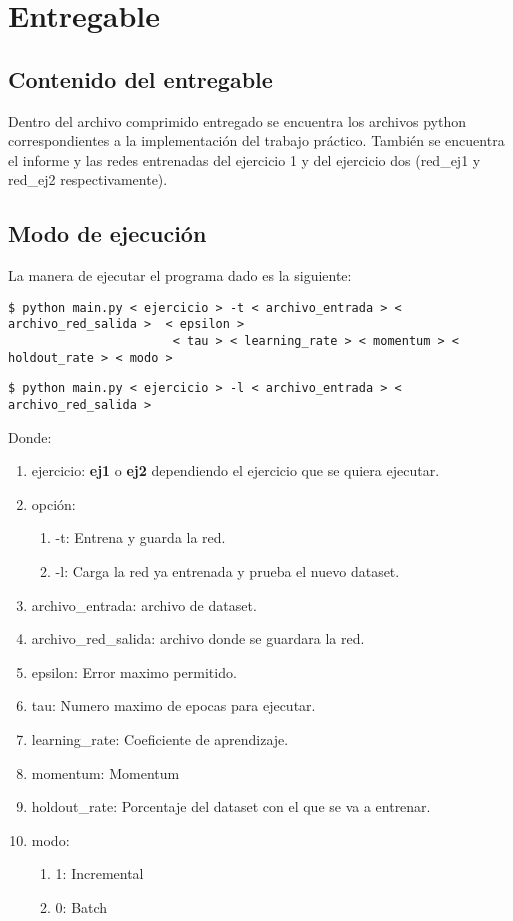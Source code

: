 \section{Entregable}
\subsection{Contenido del entregable}

Dentro del archivo comprimido entregado se encuentra los archivos python correspondientes a la implementación del trabajo práctico. También se encuentra el informe y las redes entrenadas del ejercicio 1 y del ejercicio dos (red\_ej1 y red\_ej2 respectivamente).
\subsection{Modo de ejecución}

La manera de ejecutar el programa dado es la siguiente:


\begin{verbatim}
$ python main.py < ejercicio > -t < archivo_entrada > < archivo_red_salida >  < epsilon > 
                       < tau > < learning_rate > < momentum > < holdout_rate > < modo >
\end{verbatim}
\begin{verbatim}
$ python main.py < ejercicio > -l < archivo_entrada > < archivo_red_salida > 
\end{verbatim}

Donde:

\begin{enumerate}
\item ejercicio: \textbf{ej1} o \textbf{ej2} dependiendo el ejercicio que se quiera ejecutar.
\item opción: 
\begin{enumerate}
\item -t: Entrena y guarda la red.
\item -l: Carga la red ya entrenada y prueba el nuevo dataset.
\end{enumerate}
\item archivo\_entrada: archivo de dataset.
\item archivo\_red\_salida: archivo donde se guardara la red.
\item epsilon: Error maximo permitido.
\item tau: Numero maximo de epocas para ejecutar.
\item learning\_rate: Coeficiente de aprendizaje.
\item momentum: Momentum
\item holdout\_rate: Porcentaje del dataset con el que se va a entrenar.
\item modo: 
\begin{enumerate}
\item 1: Incremental
\item 0: Batch
\end{enumerate}
\end{enumerate}


